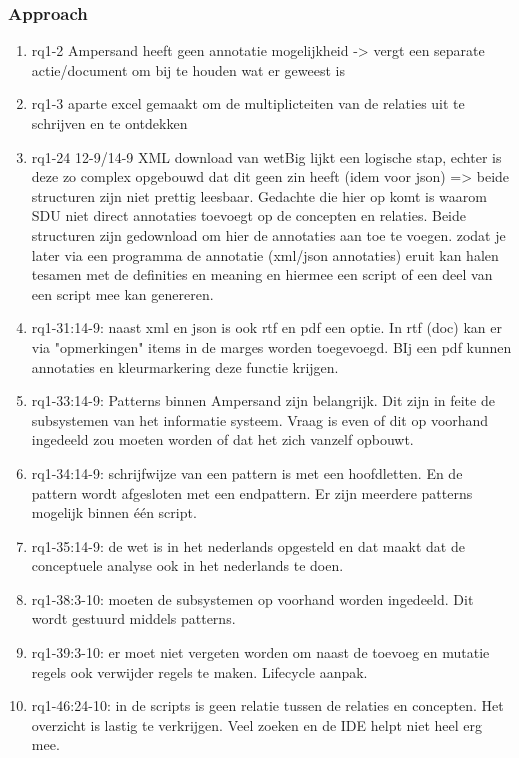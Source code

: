 \subsubsection{Approach}
\begin{comment}
plaats hier de afgehandelde items.
\end{comment}
\begin{enumerate}
    \item rq1-2 Ampersand heeft geen annotatie mogelijkheid -> vergt een separate actie/document om bij te houden wat er geweest is
    \item rq1-3 aparte excel gemaakt om de multiplicteiten van de relaties uit te schrijven en te ontdekken
    \item rq1-24 12-9/14-9 XML download van wetBig lijkt een logische stap, echter is deze zo complex opgebouwd dat dit geen zin heeft (idem voor json) => beide structuren zijn niet prettig leesbaar. Gedachte die hier op komt is waarom SDU niet direct annotaties toevoegt op de concepten en relaties. Beide structuren zijn gedownload om hier de annotaties aan toe te voegen. zodat je later via een programma de annotatie (xml/json annotaties) eruit kan halen tesamen met de definities en meaning en hiermee een script of een deel van een script mee kan genereren.
    \item rq1-31:14-9: naast xml en json is ook rtf en pdf een optie. In rtf (doc) kan er via "opmerkingen" items in de marges worden toegevoegd. BIj een pdf kunnen annotaties en kleurmarkering deze functie krijgen.
    \item rq1-33:14-9: Patterns binnen Ampersand zijn belangrijk. Dit zijn in feite de subsystemen van het informatie systeem. Vraag is even of dit op voorhand ingedeeld zou moeten worden of dat het zich vanzelf opbouwt.
    \item rq1-34:14-9: schrijfwijze van een pattern is met een hoofdletten. En de pattern wordt afgesloten met een endpattern. Er zijn meerdere patterns mogelijk binnen één script.
    \item rq1-35:14-9: de wet is in het nederlands opgesteld en dat maakt dat de conceptuele analyse ook in het nederlands te doen.
    \item rq1-38:3-10: moeten de subsystemen op voorhand worden ingedeeld. Dit wordt gestuurd middels patterns. 
    \item rq1-39:3-10: er moet niet vergeten worden om naast de toevoeg en mutatie regels ook verwijder regels te maken. Lifecycle aanpak.
    \item rq1-46:24-10: in de scripts is geen relatie tussen de relaties en concepten. Het overzicht is lastig te verkrijgen. Veel zoeken en de IDE helpt niet heel erg mee.
\end{enumerate}

